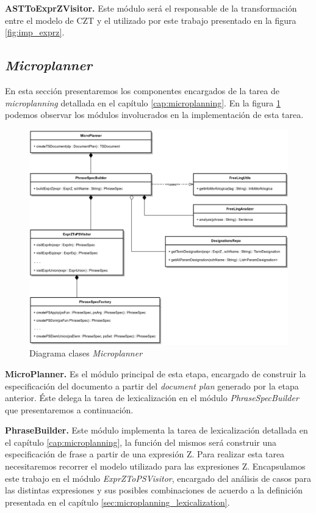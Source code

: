 \bigskip
\noindent
\textbf{ASTToExprZVisitor.} Este módulo será el responsable de la transformación entre el modelo de CZT y el utilizado por este trabajo presentado en la figura \ref{fig:imp_exprz}.


\subsection{\textit{Microplanner}}

En esta sección presentaremos los componentes encargados de la tarea de \textit{microplanning} detallada en el capítulo \ref{cap:microplanning}. En la figura \ref{fig:imp_microplanner} podemos observar los módulos involucrados en la implementación de esta tarea.

\begin{figure}[H]
  	\centering
	\includegraphics[scale=0.2]{img/microplanner_imp.png}
	\caption{Diagrama clases \textit{Microplanner}}
  	\label{fig:imp_microplanner}
\end{figure}

\bigskip
\noindent
\textbf{MicroPlanner.} Es el módulo principal de esta etapa, encargado de construir la especificación del documento a partir del \textit{document plan} generado por la etapa anterior. Éste delega la tarea de lexicalización en el módulo \textit{PhraseSpecBuilder} que presentaremos a continuación.

\bigskip
\noindent
\textbf{PhraseBuilder.} Este módulo implementa la tarea de lexicalización detallada en el capítulo \ref{cap:microplanning}, la función del mismos será construir una especificación de frase a partir de una expresión Z. Para realizar esta tarea necesitaremos recorrer el modelo utilizado para las expresiones Z. Encapsulamos este trabajo en el módulo \textit{ExprZToPSVisitor}, encargado del análisis de casos para las distintas expresiones y sus posibles combinaciones de acuerdo a la definición presentada en el capítulo \ref{sec:microplanning_lexicalization}.

